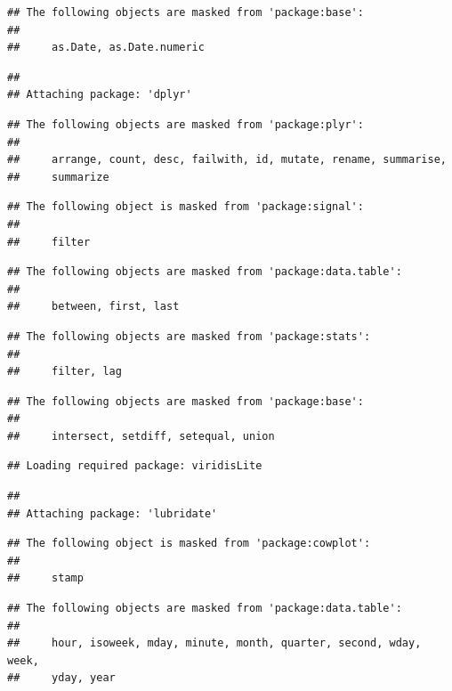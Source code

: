 \documentclass[
]{article}
\begin{document}
\begin{verbatim}
## The following objects are masked from 'package:base':
## 
##     as.Date, as.Date.numeric
\end{verbatim}

\begin{verbatim}
## 
## Attaching package: 'dplyr'
\end{verbatim}

\begin{verbatim}
## The following objects are masked from 'package:plyr':
## 
##     arrange, count, desc, failwith, id, mutate, rename, summarise,
##     summarize
\end{verbatim}

\begin{verbatim}
## The following object is masked from 'package:signal':
## 
##     filter
\end{verbatim}

\begin{verbatim}
## The following objects are masked from 'package:data.table':
## 
##     between, first, last
\end{verbatim}

\begin{verbatim}
## The following objects are masked from 'package:stats':
## 
##     filter, lag
\end{verbatim}

\begin{verbatim}
## The following objects are masked from 'package:base':
## 
##     intersect, setdiff, setequal, union
\end{verbatim}

\begin{verbatim}
## Loading required package: viridisLite
\end{verbatim}

\begin{verbatim}
## 
## Attaching package: 'lubridate'
\end{verbatim}

\begin{verbatim}
## The following object is masked from 'package:cowplot':
## 
##     stamp
\end{verbatim}

\begin{verbatim}
## The following objects are masked from 'package:data.table':
## 
##     hour, isoweek, mday, minute, month, quarter, second, wday, week,
##     yday, year
\end{verbatim}
\end{document}
